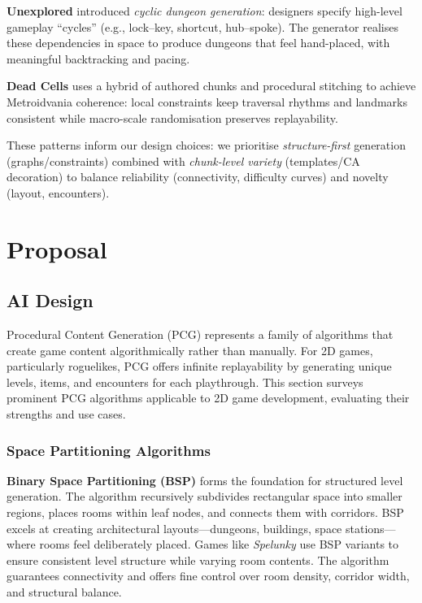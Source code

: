 \documentclass[11pt]{article}
\begin{document}
\textbf{Unexplored} introduced \emph{cyclic dungeon generation}: designers specify high-level gameplay ``cycles'' (e.g., lock–key, shortcut, hub–spoke). The generator realises these dependencies in space to produce dungeons that feel hand-placed, with meaningful backtracking and pacing.

\textbf{Dead Cells} uses a hybrid of authored chunks and procedural stitching to achieve Metroidvania coherence: local constraints keep traversal rhythms and landmarks consistent while macro-scale randomisation preserves replayability.

These patterns inform our design choices: we prioritise \emph{structure-first} generation (graphs/constraints) combined with \emph{chunk-level variety} (templates/CA decoration) to balance reliability (connectivity, difficulty curves) and novelty (layout, encounters).


\section{Proposal}

\subsection{AI Design}
\label{sec:ai_techniques}

Procedural Content Generation (PCG) represents a family of algorithms that create game content algorithmically rather than manually. For 2D games, particularly roguelikes, PCG offers infinite replayability by generating unique levels, items, and encounters for each playthrough. This section surveys prominent PCG algorithms applicable to 2D game development, evaluating their strengths and use cases.

\subsubsection{Space Partitioning Algorithms}

\textbf{Binary Space Partitioning (BSP)} forms the foundation for structured level generation. The algorithm recursively subdivides rectangular space into smaller regions, places rooms within leaf nodes, and connects them with corridors. BSP excels at creating architectural layouts—dungeons, buildings, space stations—where rooms feel deliberately placed. Games like \textit{Spelunky} use BSP variants to ensure consistent level structure while varying room contents. The algorithm guarantees connectivity and offers fine control over room density, corridor width, and structural balance.
\end{document}
